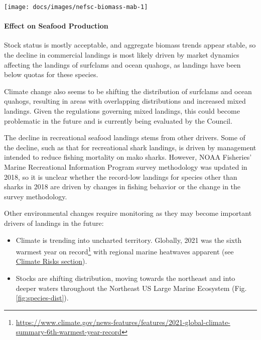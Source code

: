 \documentclass[
  10pt,
]{article}
\providecommand{\tightlist}{%
  \setlength{\itemsep}{0pt}\setlength{\parskip}{0pt}}
\let\origfigure\figure
\let\endorigfigure\endfigure
\renewenvironment{figure}[1][2] {
    \expandafter\origfigure\expandafter[H]
} {
    \endorigfigure
}
\begin{document}
\begin{figure}

{\centering \texttt{[image: docs/images/nefsc-biomass-mab-1]} 

}

\caption{Spring (left) and fall (right) surveyed biomass in the Mid-Atlantic Bight. Data from the NEFSC Bottom Trawl Survey are shown in black, with NEAMAP shown in red. The shaded area around each annual mean represents 2 standard deviations from the mean.}\label{fig:nefsc-biomass-mab}
\end{figure}

\hypertarget{effect-on-seafood-production}{%
\paragraph{Effect on Seafood
Production}\label{effect-on-seafood-production}}

Stock status is mostly acceptable, and aggregate biomass trends appear
stable, so the decline in commercial landings is most likely driven by
market dynamics affecting the landings of surfclams and ocean quahogs,
as landings have been below quotas for these species.

Climate change also seems to be shifting the distribution of surfclams
and ocean quahogs, resulting in areas with overlapping distributions and
increased mixed landings. Given the regulations governing mixed
landings, this could become problematic in the future and is currently
being evaluated by the Council.

The decline in recreational seafood landings stems from other drivers.
Some of the decline, such as that for recreational shark landings, is
driven by management intended to reduce fishing mortality on mako
sharks. However, NOAA Fisheries' Marine Recreational Information Program
survey methodology was updated in 2018, so it is unclear whether the
record-low landings for species other than sharks in 2018 are driven by
changes in fishing behavior or the change in the survey methodology.

Other environmental changes require monitoring as they may become
important drivers of landings in the future:

\begin{itemize}
\tightlist
\item
  Climate is trending into uncharted territory. Globally, 2021 was the
  sixth warmest year on record\footnote{\url{https://www.climate.gov/news-features/features/2021-global-climate-summary-6th-warmest-year-record}}
  with regional marine heatwaves apparent (see
  \protect\hyperlink{climate-and-ecosystem-productivity}{Climate Risks
  section}).\\
\item
  Stocks are shifting distribution, moving towards the northeast and
  into deeper waters throughout the Northeast US Large Marine Ecosystem
  (Fig. \ref{fig:species-dist}).
\end{itemize}
\end{document}
